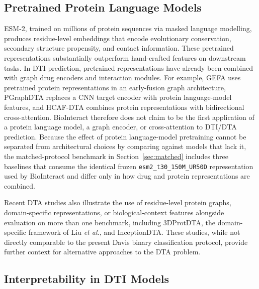 \documentclass[fleqn,10pt]{wlscirep}
\begin{document}
\subsection{Pretrained Protein Language Models}

ESM-2,\cite{lin2023evolutionary} trained on millions of protein sequences
via masked language modelling, produces residue-level embeddings that encode
evolutionary conservation, secondary structure propensity, and contact
information.  These pretrained representations substantially outperform
hand-crafted features on downstream tasks.\cite{rives2021biological}  In DTI
prediction, pretrained representations have already been combined with graph
drug encoders and interaction modules.  For example, GEFA uses pretrained
protein representations in an early-fusion graph architecture,\cite{nguyen2022gefa}
PGraphDTA replaces a CNN target encoder with protein language-model features,
\cite{bal2023pgraphdta} and HCAF-DTA combines protein representations with
bidirectional cross-attention.\cite{li2025hcafdta}  BioInteract therefore does
not claim to be the first application of a protein language model, a graph
encoder, or cross-attention to DTI/DTA prediction.
Because the effect of protein language-model pretraining cannot be separated
from architectural choices by comparing against models that lack it, the
matched-protocol benchmark in Section~\ref{sec:matched} includes three
baselines that consume the identical frozen \texttt{esm2\_t30\_150M\_UR50D}
representation used by BioInteract and differ only in how drug and protein
representations are combined.

Recent DTA studies also illustrate the use of residue-level protein graphs,
domain-specific representations, or biological-context features alongside
evaluation on more than one benchmark, including 3DProtDTA,\cite{voitsitskyi2023_3dprotdta}
the domain-specific framework of Liu \textit{et al.},\cite{liu2024domainspecific}
and InceptionDTA.\cite{kalemati2025inceptiondta}
These studies, while not directly comparable to the present Davis binary
classification protocol, provide further context for alternative approaches to
the DTA problem.

\subsection{Interpretability in DTI Models}
\end{document}
